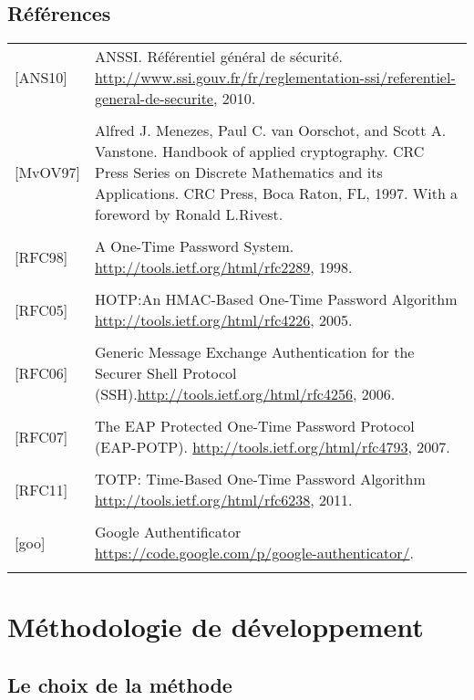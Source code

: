 \documentclass{../../res/univ-projet}
\begin{document}
	\subsection{Références} 
	\begin{tabular}{p{}>{\raggedright\arraybackslash}p{13cm}}
		{[ANS10]} & {ANSSI. Référentiel général de sécurité. \href{http://www.ssi.gouv.fr/fr/reglementation-ssi/referentiel-general-de-securite}{http://www.ssi.gouv.fr/fr/reglementation-ssi/referentiel-general-de-securite}, 2010.}
		\tabularnewline
		\\
		{[MvOV97]} & {Alfred J. Menezes, Paul C. van Oorschot, and Scott A. Vanstone. Handbook of applied cryptography. CRC Press Series on Discrete Mathematics and its Applications. CRC Press, Boca Raton, FL, 1997. With a foreword by Ronald L.Rivest.}
		\tabularnewline
		\\
		{[RFC98]} & {A One-Time Password System. \href{http://tools.ietf.org/html/rfc2289}{http://tools.ietf.org/html/rfc2289}, 1998.}
		\tabularnewline
		\\
		{[RFC05]} & {HOTP:An HMAC-Based One-Time Password Algorithm \href{http://tools.ietf.org/html/rfc4226}{http://tools.ietf.org/html/rfc4226}, 2005.}
		\tabularnewline
		\\
		{[RFC06]} & {Generic Message Exchange Authentication for the Securer Shell Protocol (SSH).\href{http://tools.ietf.org/html/rfc4256}{http://tools.ietf.org/html/rfc4256}, 2006.}
		\tabularnewline
		\\
		{[RFC07]} & {The EAP Protected One-Time Password Protocol (EAP-POTP). \href{http://tools.ietf.org/html/rfc4793}{http://tools.ietf.org/html/rfc4793}, 2007.}
		\tabularnewline
		\\
		{[RFC11]} & {TOTP: Time-Based One-Time Password Algorithm \href{http://tools.ietf.org/html/rfc6238}{http://tools.ietf.org/html/rfc6238}, 2011.}
		\tabularnewline
		\\
		{[goo]} & {Google Authentificator \href{https://code.google.com/p/google-authenticator/}{https://code.google.com/p/google-authenticator/}.}
		\tabularnewline
		\\
	\end{tabular}
\newpage
\section{Méthodologie de développement}
\subsection{Le choix de la méthode}
\end{document}
